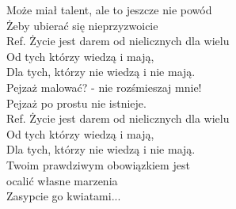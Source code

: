 
Może miał talent, ale to jeszcze nie powód \\
Żeby ubierać się nieprzyzwoicie \\
\hops
Ref. Życie jest darem od nielicznych dla wielu\\
 Od tych którzy wiedzą i mają, \\
 Dla tych, którzy nie wiedzą i nie mają. \\
\hops
Pejzaż malować? - nie rozśmieszaj mnie! \\
Pejzaż po prostu nie istnieje. \\
\hops
Ref. Życie jest darem od nielicznych dla wielu\\
 Od tych którzy wiedzą i mają, \\
 Dla tych, którzy nie wiedzą i nie mają. \\
\hops
Twoim prawdziwym obowiązkiem jest \\
ocalić własne marzenia \\
\hops
Zasypcie go kwiatami...